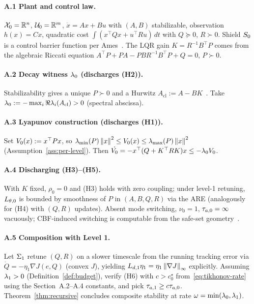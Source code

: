 \documentclass[conference]{IEEEtran}
\begin{document}
\paragraph{A.1 Plant and control law.}
$\mathcal{X}_0 = \mathbb{R}^n$, $\mathcal{U}_0 = \mathbb{R}^m$,
$\dot{x} = Ax + Bu$ with $(A, B)$ stabilizable, observation
$h(x) = Cx$, quadratic cost $\int (x^\top Q x + u^\top R u)\,dt$
with $Q \succeq 0$, $R \succ 0$.  Shield $S_0$ is a control
barrier function per Ames~\cite{ames2019cbf}.  The LQR gain
$K = R^{-1} B^\top P$ comes from the algebraic Riccati equation
$A^\top P + P A - P B R^{-1} B^\top P + Q = 0$, $P \succ 0$.

\paragraph{A.2 Decay witness $\lambda_0$ (discharges (H2)).}
Stabilizability gives a unique $P \succ 0$ and a Hurwitz
$A_{\text{cl}} := A - BK$~\cite{khalil2002nonlinear}.  Take
$\lambda_0 := -\max_i \Re \lambda_i(A_{\text{cl}}) > 0$ (spectral
abscissa).

\paragraph{A.3 Lyapunov construction (discharges (H1)).}
Set $V_{0}(x) := x^\top P x$, so
$\lambda_{\min}(P) \left\| x \right\|^2 \leq V_{0}(x) \leq
\lambda_{\max}(P) \left\| x \right\|^2$ (Assumption~\ref{ass:per-level}).
Then $\dot{V_{0}} = -x^\top (Q + K^\top R K) x
\leq -\lambda_0 V_{0}$.

\paragraph{A.4 Discharging (H3)--(H5).}
With $K$ fixed, $\rho_0 = 0$ and (H3) holds with zero coupling;
under level-1 retuning, $L_{\theta,0}$ is bounded by smoothness of
$P$ in $(A, B, Q, R)$ via the ARE (analogously for (H4) with
$(Q, R)$ updates).  Absent mode switching, $\nu_0 = 1$,
$\taua[0] = \infty$ vacuously; CBF-induced switching is computable
from the safe-set geometry~\cite{ames2019cbf}.

\paragraph{A.5 Composition with Level 1.}
Let $\Sigma_1$ retune $(Q, R)$ on a slower timescale from the running
tracking error via $\dot{Q} = -\eta_1 \nabla J(e, Q)$ (convex $J$),
yielding $L_{d,1}\eta_1 = \eta_1 \left\| \nabla J \right\|_\infty$ explicitly.
Assuming $\lambda_1 > 0$ (Definition~\ref{def:budget}), verify (H6)
with $c > c^\star_0$ from~\eqref{eq:tikhonov-rate} using the
Section~A.2--A.4 constants, and pick $\taua[1] \geq c \taua[0]$.
Theorem~\ref{thm:recursive} concludes composite stability at rate
$\omega = \min(\lambda_0, \lambda_1)$.
\end{document}
